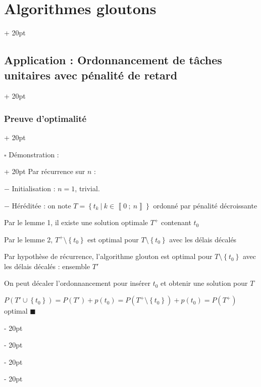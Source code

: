 \documentclass[a4paper, 12pt, twoside]{article}
\newcommand{\nset}[2]{\left\llbracket #1\ ;\ #2 \right\rrbracket}
\newcommand{\set}[1]{\left\{ #1 \right\}}
\newcommand{\ind}[1][20pt]{\advance\leftskip + #1}
\newcommand{\deind}[1][20pt]{\advance\leftskip - #1}
\newenvironment{indt}[2][20pt]{#2 \par \ind[#1]}{\par \deind} %
\begin{document}
\begin{indt}{\section{Algorithmes gloutons}}
\begin{indt}{\subsection{Application : Ordonnancement de tâches unitaires avec pénalité de retard}}
\begin{indt}{\subsubsection{Preuve d'optimalité}}
                \vspace{12pt}
                
                \begin{indt}{$\square$ Démonstration :}
                    Par récurrence sur $n$ :
                    
                    $-$ Initialisation : $n = 1$, trivial.
                    
                    $-$ Héréditée : on note $T = \set{t_k\ |\ k \in \nset 0 n}$ ordonné par pénalité décroissante
                    
                    Par le lemme 1, il existe une solution optimale $T^+$ contenant $t_0$
                    
                    Par le lemme 2, $T^+ \setminus \set{t_0}$ est optimal pour $T \setminus \set{t_0}$ avec les délais décalés
                    
                    Par hypothèse de récurrence, l'algorithme glouton est optimal pour $T \setminus \set{t_0}$ avec les délais décalés : ensemble $T'$
                    
                    On peut décaler l'ordonnancement pour insérer $t_0$ et obtenir une solution pour $T$
                    
                    $P(T' \cup \set{t_0}) = P(T') + p(t_0) = P(T^+ \setminus \set{t_0}) + p(t_0) = P(T^+)$ optimal
                    $\blacksquare$
                \end{indt}
            \end{indt}
        \end{indt}
        
    \end{indt}
    
    
    
\end{document}

